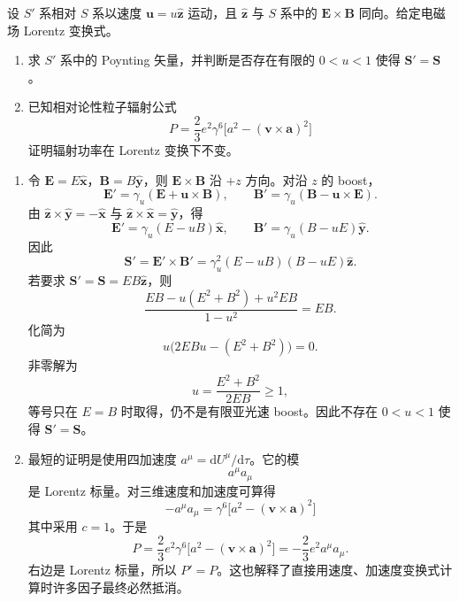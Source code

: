 \begin{question}
设 $S'$ 系相对 $S$ 系以速度 $\mathbf u=u\hat{\mathbf z}$ 运动，且 $\hat{\mathbf z}$ 与 $S$ 系中的 $\mathbf E\times\mathbf B$ 同向。给定电磁场 Lorentz 变换式。
\begin{enumerate}
  \item 求 $S'$ 系中的 Poynting 矢量，并判断是否存在有限的 $0<u<1$ 使得 $\mathbf S'=\mathbf S$。
  \item 已知相对论性粒子辐射公式
  \[
    P=\frac23e^2\gamma^6\bigl[a^2-(\mathbf v\times\mathbf a)^2\bigr]
  \]
  证明辐射功率在 Lorentz 变换下不变。
\end{enumerate}
\begin{solution}
\begin{enumerate}
  \item 令 $\mathbf E=E\hat{\mathbf x}$，$\mathbf B=B\hat{\mathbf y}$，则 $\mathbf E\times\mathbf B$ 沿 $+z$ 方向。对沿 $z$ 的 boost，
  \[
    \mathbf E'=\gamma_u(\mathbf E+\mathbf u\times\mathbf B),
    \qquad
    \mathbf B'=\gamma_u(\mathbf B-\mathbf u\times\mathbf E) .
  \]
  由 $\hat{\mathbf z}\times\hat{\mathbf y}=-\hat{\mathbf x}$ 与 $\hat{\mathbf z}\times\hat{\mathbf x}=\hat{\mathbf y}$，得
  \[
    \mathbf E'=\gamma_u(E-uB)\hat{\mathbf x},
    \qquad
    \mathbf B'=\gamma_u(B-uE)\hat{\mathbf y} .
  \]
  因此
  \[
    \boxed{\mathbf S'=\mathbf E'\times\mathbf B'
    =\gamma_u^2(E-uB)(B-uE)\hat{\mathbf z}} .
  \]
  若要求 $\mathbf S'=\mathbf S=EB\hat{\mathbf z}$，则
  \[
    \frac{EB-u(E^2+B^2)+u^2EB}{1-u^2}=EB .
  \]
  化简为
  \[
    u\bigl(2EBu-(E^2+B^2)\bigr)=0 .
  \]
  非零解为
  \[
    u=\frac{E^2+B^2}{2EB}\geq1,
  \]
  等号只在 $E=B$ 时取得，仍不是有限亚光速 boost。因此不存在 $0<u<1$ 使得 $\mathbf S'=\mathbf S$。

  \item 最短的证明是使用四加速度 $a^\mu=\mathrm dU^\mu/\mathrm d\tau$。它的模
  \[
    a^\mu a_\mu
  \]
  是 Lorentz 标量。对三维速度和加速度可算得
  \[
    -a^\mu a_\mu=\gamma^6\bigl[a^2-(\mathbf v\times\mathbf a)^2\bigr]
  \]
  其中采用 $c=1$。于是
  \[
    P=\frac23e^2\gamma^6\bigl[a^2-(\mathbf v\times\mathbf a)^2\bigr]
    =-\frac23e^2a^\mu a_\mu .
  \]
  右边是 Lorentz 标量，所以 $P'=P$。这也解释了直接用速度、加速度变换式计算时许多因子最终必然抵消。
\end{enumerate}
\end{solution}
\end{question}

